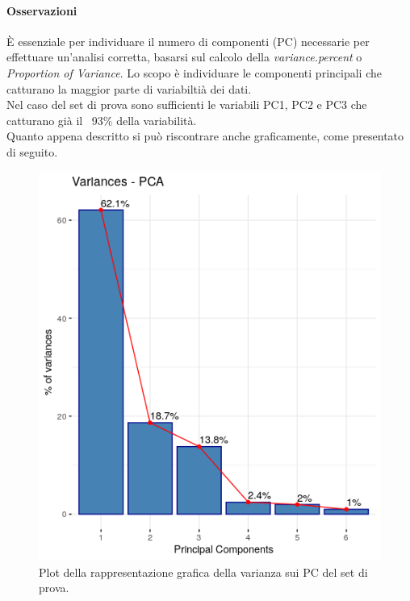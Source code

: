 \paragraph{Osservazioni}
\`E essenziale per individuare il numero di componenti (PC) necessarie per effettuare un'analisi corretta, basarsi sul calcolo della \textit{variance.percent} o \textit{Proportion of Variance}. Lo scopo \`e individuare le componenti principali che catturano la maggior parte di variabilti\`a dei dati.\\
Nel caso del set di prova sono sufficienti le variabili PC1, PC2 e PC3 che catturano gi\`a il ~93\% della variabilit\`a.\\
Quanto appena descritto si pu\`o riscontrare anche graficamente, come presentato di seguito.

\begin{figure}[H]
\centering
	\includegraphics[width=0.60\linewidth]{../../PCA/plot/variances_rete-prova.png}
	\caption{Plot della rappresentazione grafica della varianza sui PC del set di prova.}
	\label{Plot della rappresentazione grafica della varianza sui PC del set di prova.}
\end{figure}

